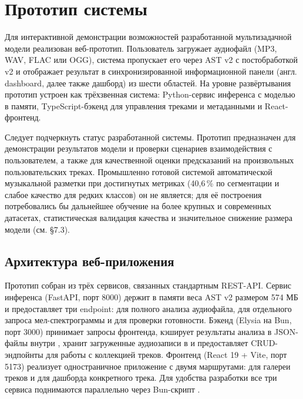\chapter{Прототип системы}\label{ch:6}

Для интерактивной демонстрации возможностей разработанной мультизадачной модели реализован веб-прототип. Пользователь загружает аудиофайл (MP3, WAV, FLAC или OGG), система пропускает его через AST v2 с постобработкой v2 и отображает результат в синхронизированной информационной панели (англ. dashboard, далее также дашборд) из шести областей. На уровне развёртывания прототип устроен как трёхзвенная система: Python-сервис инференса с моделью в памяти, TypeScript-бэкенд для управления треками и метаданными и React-фронтенд.

Следует подчеркнуть статус разработанной системы. Прототип предназначен для демонстрации результатов модели и проверки сценариев взаимодействия с пользователем, а также для качественной оценки предсказаний на произвольных пользовательских треках. Промышленно готовой системой автоматической музыкальной разметки при достигнутых метриках (40{,}6\,\% по сегментации и слабое качество для редких классов) он не является; для её построения потребовались бы дальнейшее обучение на более крупных и современных датасетах, статистическая валидация качества и значительное снижение размера модели (см. §7.3).

\section{Архитектура веб-приложения}\label{sec:6-1}

Прототип собран из трёх сервисов, связанных стандартным REST-API. Сервис инференса (FastAPI, порт 8000) держит в памяти веса AST v2 размером 574 МБ и предоставляет три endpoint:  для полного анализа аудиофайла,  для отдельного запроса мел-спектрограммы и  для проверки готовности. Бэкенд (Elysia на Bun, порт 3000) принимает запросы фронтенда, кэширует результаты анализа в JSON-файлы внутри , хранит загруженные аудиозаписи в  и предоставляет CRUD-эндпойнты для работы с коллекцией треков. Фронтенд (React 19 + Vite, порт 5173) реализует одностраничное приложение с двумя маршрутами: \code{/} для галереи треков и  для дашборда конкретного трека. Для удобства разработки все три сервиса поднимаются параллельно через Bun-скрипт .


